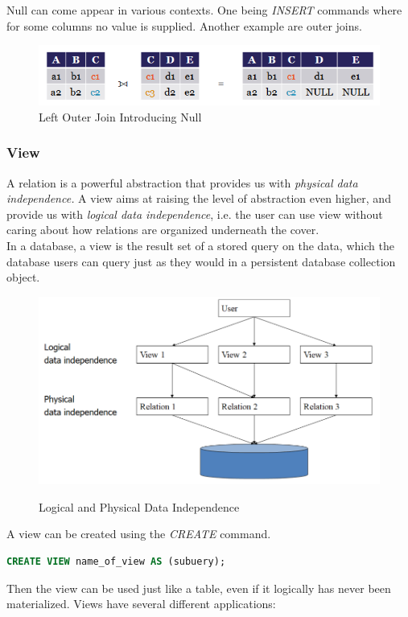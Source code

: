 Null can come appear in various contexts. One being \textit{INSERT} commands where for some columns no value is supplied. Another example are outer joins.
\begin{figure}[H]
\centering
\includegraphics[width=.8\textwidth]{images/outer_join_introducing_null.PNG}
\caption{Left Outer Join Introducing Null}
\label{join_introducing_null}
\end{figure}

\subsubsection{View}
A relation is a powerful abstraction that provides us with \textit{physical data independence.} A view aims at raising the level of abstraction even higher, and provide us with \textit{logical data independence}, i.e. the user can use view without caring about how relations are organized underneath the cover. \\
In a database, a view is the result set of a stored query on the data, which the database users can query just as they would in a persistent database collection object. 
\begin{figure}[H]
\centering
\includegraphics[width=.5\textwidth]{images/view_independence.PNG}
\label{view_independence}
\caption{Logical and Physical Data Independence}
\end{figure}
A view can be created using the \textit{CREATE} command.
\begin{lstlisting}[language=SQL]
CREATE VIEW name_of_view AS (subuery);
\end{lstlisting}
Then the view can be used just like a table, even if it logically has never been materialized. Views have several different applications:
